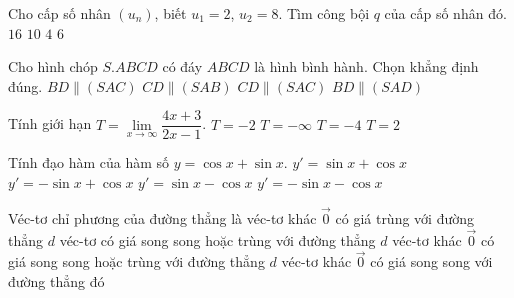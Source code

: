 \begin{ex}%
Cho cấp số nhân $(u_n)$, biết $u_1=2$, $u_2=8$. Tìm công bội $q$ của cấp số nhân đó.
\choice
{$16$}
{$10$}
{\True $4$}
{$6$}
\end{ex} 

\begin{ex}%
Cho hình chóp $S.ABCD$ có đáy $ABCD$ là hình bình hành. Chọn khẳng định đúng.
\choice
{$BD\parallel (SAC)$}
{\True $CD\parallel (SAB)$}
{$CD\parallel (SAC)$}
{$BD\parallel (SAD)$}
\end{ex}

\begin{ex}%
Tính giới hạn $T=\lim\limits_{x\rightarrow \infty}\dfrac{4x+3}{2x-1}$.
\choice
{$T=-2$}
{$T=-\infty$}
{$T=-4$}
{\True $T=2$}
\end{ex}

\begin{ex}%
Tính đạo hàm của hàm số $y=\cos x+\sin x$.
\choice
{$y'=\sin x+\cos x$}
{\True $y'=-\sin x+\cos x$}
{$y'=\sin x-\cos x$}
{$y'=-\sin x-\cos x$}
\end{ex}

\begin{ex}%
Véc-tơ chỉ phương của đường thẳng là
\choice
{véc-tơ khác $\overrightarrow{0}$ có giá trùng với đường thẳng $d$}
{véc-tơ có giá song song hoặc trùng với đường thẳng $d$}
{\True véc-tơ khác $\overrightarrow{0}$ có giá song song hoặc trùng với đường thẳng $d$}
{véc-tơ khác $\overrightarrow{0}$ có giá song song với đường thẳng đó}
\end{ex}

